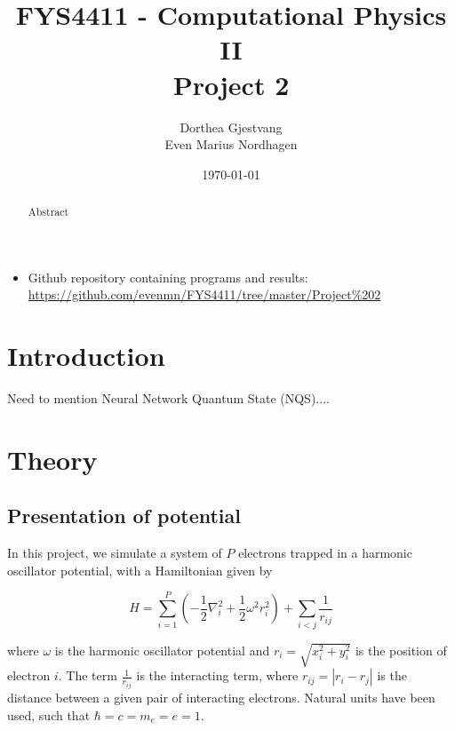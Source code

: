 \documentclass[norsk,a4paper,12pt]{article}
\title{FYS4411 - Computational Physics II\\\vspace{2mm} \Large{Project 2}}
\author{\large Dorthea Gjestvang\\ Even Marius Nordhagen}
\date\today
\begin{document}
\maketitle

\begin{itemize}
\item Github repository containing programs and results: \\\url{https://github.com/evenmn/FYS4411/tree/master/Project%202}
\end{itemize}

\begin{abstract}
Abstract
\par 

\end{abstract}

\newpage

\tableofcontents

\newpage

\section{Introduction} \label{sec:Introduction}
Need to mention Neural Network Quantum State (NQS)....

\section{Theory} \label{sec:Theory}
\subsection{Presentation of potential} \label{sec:Presentation_of_potential}
In this project, we simulate a system of $P$ electrons trapped in a harmonic oscillator potential, with a Hamiltonian given by

\begin{equation}
\label{eq:Hamiltonian}
\hat{H} = \sum_{i=1}^{P} (-\frac{1}{2} \nabla_i^2 + \frac{1}{2} \omega^2 r_i ^2) + \sum_{i<j} \frac{1}{r_{ij}} 
\end{equation}

where $\omega$ is the harmonic oscillator potential and  $r_i = \sqrt{x_i^2 + y_i^2}$ is the position of electron $i$. The term $\frac{1}{r_{ij}}$ is the interacting term, where $r_{ij} = |r_i - r_j|$ is the distance between a given pair of interacting electrons. Natural units have been used, such that $\hbar = c = m_e = e = 1$.
\end{document}
